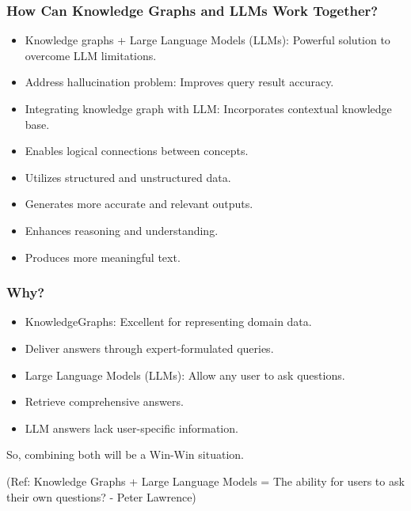 \begin{frame}[fragile]\frametitle{How Can Knowledge Graphs and LLMs Work Together?}

\begin{itemize}
\item Knowledge graphs + Large Language Models (LLMs): Powerful solution to overcome LLM limitations.
\item Address hallucination problem: Improves query result accuracy.
\item Integrating knowledge graph with LLM: Incorporates contextual knowledge base.
\item Enables logical connections between concepts.
\item Utilizes structured and unstructured data.
\item Generates more accurate and relevant outputs.
\item Enhances reasoning and understanding.
\item Produces more meaningful text.
\end{itemize}

\end{frame}

\begin{frame}[fragile]\frametitle{Why?}

\begin{itemize}
\item KnowledgeGraphs: Excellent for representing domain data.
\item Deliver answers through expert-formulated queries.
\item Large Language Models (LLMs): Allow any user to ask questions.
\item Retrieve comprehensive answers.
\item LLM answers lack user-specific information.
\end{itemize}
	
So, combining both will be a Win-Win situation.

{\tiny (Ref: Knowledge Graphs + Large Language Models = The ability for users to ask their own questions? - Peter Lawrence)}

\end{frame}


